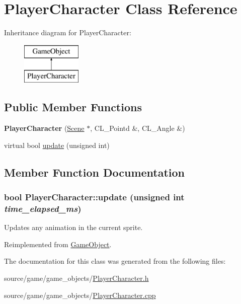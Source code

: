\hypertarget{classPlayerCharacter}{
\section{PlayerCharacter Class Reference}
\label{classPlayerCharacter}
}
Inheritance diagram for PlayerCharacter:\begin{figure}[H]
\begin{center}
\leavevmode
\includegraphics[height=2cm]{classPlayerCharacter}
\end{center}
\end{figure}
\subsection*{Public Member Functions}
\begin{DoxyCompactItemize}
\item 
\hypertarget{classPlayerCharacter_ae149479e53921ed11bfcc84a2c44242d}{
{\bfseries PlayerCharacter} (\hyperlink{classScene}{Scene} $\ast$, CL\_\-Pointd \&, CL\_\-Angle \&)}
\label{classPlayerCharacter_ae149479e53921ed11bfcc84a2c44242d}

\item 
virtual bool \hyperlink{classPlayerCharacter_a97278f67b0d1c2646c95f2b9b361f796}{update} (unsigned int)
\end{DoxyCompactItemize}


\subsection{Member Function Documentation}
\hypertarget{classPlayerCharacter_a97278f67b0d1c2646c95f2b9b361f796}{
\subsubsection[{update}]{\setlength{\rightskip}{0pt plus 5cm}bool PlayerCharacter::update (unsigned int {\em time\_\-elapsed\_\-ms})}}
\label{classPlayerCharacter_a97278f67b0d1c2646c95f2b9b361f796}
Updates any animation in the current sprite. 

Reimplemented from \hyperlink{classGameObject_ad2f3cd5d1f5a11b237507cd3ee98b95d}{GameObject}.



The documentation for this class was generated from the following files:\begin{DoxyCompactItemize}
\item 
source/game/game\_\-objects/\hyperlink{PlayerCharacter_8h}{PlayerCharacter.h}\item 
source/game/game\_\-objects/\hyperlink{PlayerCharacter_8cpp}{PlayerCharacter.cpp}\end{DoxyCompactItemize}
